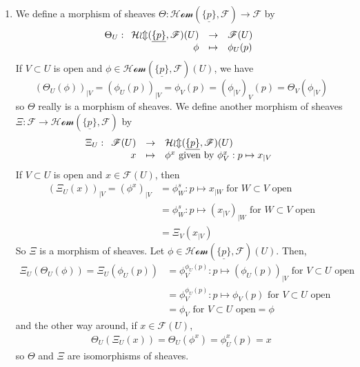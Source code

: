 \documentclass{article}
\newcommand{\applic}[4]{\begin{array}[t]{rcl}
#1 & \to & #2 \\
#3 & \mapsto & #4
\end{array}}
\newcommand{\Fsheaf}{\mathscr{F}}
\newcommand{\sheafHom}{\mathcal{Hom}}
\newcommand{\exercise}{\subsubsection} %
\begin{document}
\exercise{}
\begin{enumerate}
    \item We define a morphism of sheaves $\Theta : \sheafHom(\underline{\{p\}},\Fsheaf) \to \Fsheaf$ by
    \[\Theta_U : \applic{\sheafHom(\underline{\{p\}},\Fsheaf)(U)}{\Fsheaf(U)}{\phi}{\phi_U(p)}\]
    If $V\subset U$ is open and $\phi \in \sheafHom(\underline{\{p\}},\Fsheaf)(U)$, we have
    \[(\Theta_U (\phi))_{\mid V} = (\phi_U (p))_{\mid V} = \phi_V(p) = (\phi_{\mid V})_V (p) = \Theta_V(\phi_{\mid V})\]
    so $\Theta$ really is a morphism of sheaves. We define another morphism of sheaves $\Xi : \Fsheaf \to \sheafHom(\underline{\{p\}},\Fsheaf)$ by
    \[\Xi_U : \applic{\Fsheaf(U)}{\sheafHom(\underline{\{p\}},\Fsheaf)(U)}{x}{\phi^x \text{ given by } \phi_V^x : p \mapsto x_{\mid V}}\]
    If $V \subset U$ is open and $x \in \Fsheaf(U)$, then
    \begin{align*}
        (\Xi_U (x))_{\mid V} = (\phi^x)_{\mid V} & = \phi_W^s : p \mapsto x_{\mid W} \text{ for $W \subset V$ open} \\
        & = \phi_W^s : p \mapsto (x_{\mid V})_{\mid W} \text{ for $W \subset V$ open} \\
        & = \Xi_V(x_{\mid V})
    \end{align*}
    So $\Xi$ is a morphism of sheaves. Let $\phi \in \sheafHom(\underline{\{p\}},\Fsheaf)(U)$. Then,
    \begin{align*}
        \Xi_U (\Theta_U (\phi)) = \Xi_U (\phi_U(p)) & = \phi^{\phi_U (p)}_V : p \mapsto (\phi_U(p))_{\mid V} \text{ for $V \subset U$ open} \\
        & = \phi^{\phi_U (p)}_V : p \mapsto \phi_V(p) \text{ for $V \subset U$ open} \\
        & = \phi_V \text{ for $V \subset U$ open} = \phi
    \end{align*}
    and the other way around, if $x \in \Fsheaf(U)$,
    \begin{align*}
        \Theta_U (\Xi_U (x)) = \Theta_U(\phi^x) = \phi^x_U (p) = x
    \end{align*}
    so $\Theta$ and $\Xi$ are isomorphisms of sheaves.


\end{enumerate}
\end{document}
